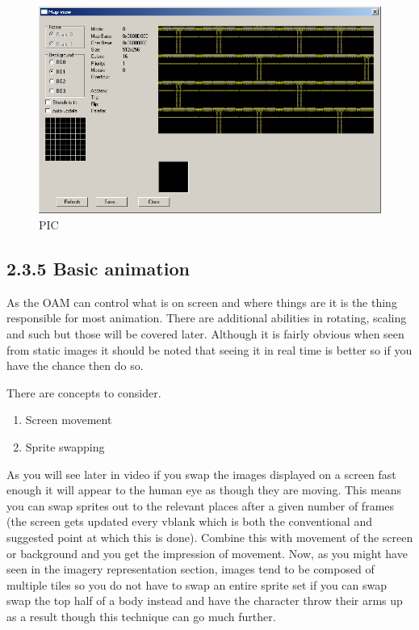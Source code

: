 \documentclass[
]{book}
\providecommand{\tightlist}{%
  \setlength{\itemsep}{0pt}\setlength{\parskip}{0pt}}
\begin{document}
\begin{figure}
\centering
\includegraphics{images/47_home_fast6191_romhackingguide_unrenamed_file___riginal_borders_romhackingguideBGlayering11.png}
\caption{PIC}
\end{figure}

\hypertarget{basic-animation}{%
\subsection{2.3.5 Basic animation}\label{basic-animation}}

As the OAM can control what is on screen and where things are it is the thing responsible for most animation. There are additional abilities in rotating, scaling and such but those will be covered later. Although it is fairly obvious when seen from static images it should be noted that seeing it in real time is better so if you have the chance then do so.

There are concepts to consider.

\begin{enumerate}
\def\labelenumi{\arabic{enumi}.}
\tightlist
\item
  Screen movement
\item
  Sprite swapping
\end{enumerate}

As you will see later in video if you swap the images displayed on a screen fast enough it will appear to the human eye as though they are moving. This means you can swap sprites out to the relevant places after a given number of frames (the screen gets updated every vblank which is both the conventional and suggested point at which this is done). Combine this with movement of the screen or background and you get the impression of movement. Now, as you might have seen in the imagery representation section, images tend to be composed of multiple tiles so you do not have to swap an entire sprite set if you can swap swap the top half of a body instead and have the character throw their arms up as a result though this technique can go much further.
\end{document}
